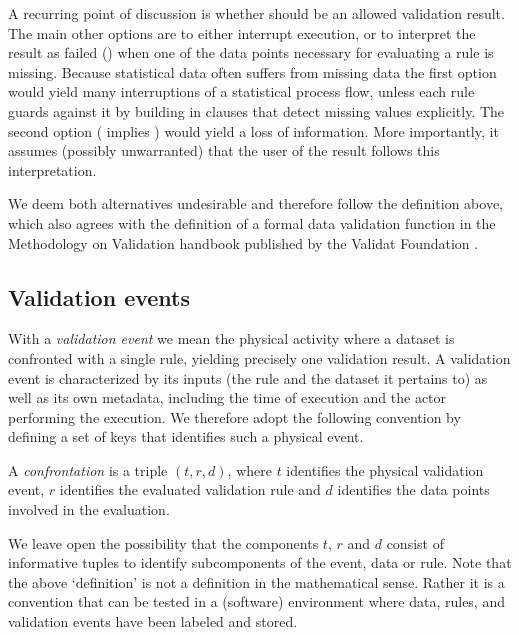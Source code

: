 A recurring point of discussion is whether \na{} should be an allowed
validation result. The main other options are to either interrupt execution, or
to interpret the result as failed (\onwaar{}) when one of the data points
necessary for evaluating a rule is missing. Because statistical data often
suffers from missing data the first option would yield many interruptions of a
statistical process flow, unless each rule guards against it by building in
clauses that detect missing values explicitly. The second option (\na{} implies
\onwaar{}) would yield a loss of information. More importantly, it assumes
(possibly unwarranted) that the user of the result follows this interpretation.

We deem both alternatives undesirable and therefore follow the definition
above, which also agrees with the definition of a formal data validation
function in the Methodology on Validation handbook published by the Validat
Foundation \cite{zio2015methodology}.

\subsection{Validation events}

With a \emph{validation event} we mean the physical activity where a dataset is
confronted with a single rule, yielding precisely one validation result. A
validation event is characterized by its inputs (the rule and the dataset it
pertains to) as well as its own metadata, including the time of execution and
the actor performing the execution. We therefore adopt the following convention
by defining a set of keys that identifies such a physical event.
%
\begin{definition}[confrontation] 
A \emph{confrontation} is a triple $(t,r,d)$, where $t$ identifies the physical
validation event, $r$ identifies the evaluated validation rule and $d$
identifies the data points involved in the evaluation.
\label{def:validationevent}
\end{definition}
%
We leave open the possibility that the components $t$, $r$ and $d$ consist of
informative tuples to identify subcomponents of the event, data or rule. Note
that the above `definition' is not a definition in the mathematical sense.
Rather it is a convention that can be tested in a (software) environment where
data, rules, and validation events have been labeled and stored.


